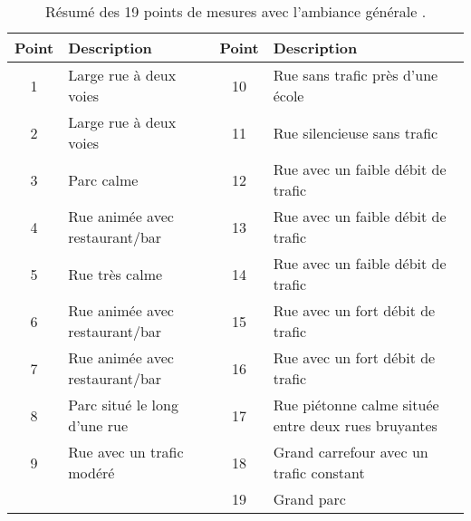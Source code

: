 \begin{table}[h]
\caption{Résumé des 19 points de mesures avec l'ambiance générale \cite{aumond2017modeling}.}
\centering
\begin{tabular}{c p{6cm}|c p{6cm}}
\toprule
\textbf{Point} & \textbf{Description  }                 & \textbf{Point} & \textbf{Description                                      } \\ \midrule
1     & Large rue à deux voies        & 10    & Rue sans trafic près d’une école                  \\ 
\rowcolor[HTML]{C0C0C0}
2     & Large rue à deux voies        & 11    & Rue silencieuse sans trafic                       \\ 
3     & Parc calme                    & 12    & Rue avec un faible débit de trafic                \\ 
\rowcolor[HTML]{C0C0C0}
4     & Rue animée avec restaurant/bar & 13    & Rue avec un faible débit de trafic                \\ 
5     & Rue très calme                & 14    & Rue avec un faible débit de trafic                \\ 
\rowcolor[HTML]{C0C0C0}
6     & Rue animée avec restaurant/bar & 15    & Rue avec un fort débit de trafic                  \\ 
7     & Rue animée avec restaurant/bar & 16    & Rue avec un fort débit de trafic                  \\ 
\rowcolor[HTML]{C0C0C0}
8     & Parc situé le long d’une rue  & 17    & Rue piétonne calme située entre deux rues bruyantes \\ 
9     & Rue avec un trafic modéré     & 18    & Grand carrefour avec un trafic constant           \\ 
\rowcolor[HTML]{C0C0C0}
      &                               & 19    & Grand parc                                        \\ \bottomrule
\end{tabular}
\label{tab:resume19pts}
\end{table}